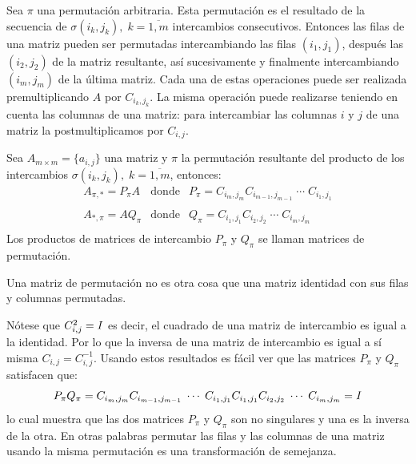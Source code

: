 Sea $\pi$ una permutación arbitraria. Esta permutación es el resultado de la secuencia de $\sigma(i_k, j_k),\; k=\overline{1,m}$ intercambios consecutivos. Entonces las filas de una matriz pueden ser permutadas intercambiando las filas $(i_1, j_1)$, después las $(i_2, j_2)$ de la matriz resultante, as\'i sucesivamente y finalmente intercambiando $(i_m, j_m)$ de la \'ultima matriz. Cada una de estas operaciones puede ser realizada premultiplicando $A$ por $C_{i_k, j_k}$. La misma operación puede realizarse teniendo en cuenta las columnas de una matriz: para intercambiar las columnas $i$ y $j$ de una matriz la postmultiplicamos por $C_{i,j}$.
\begin{lemma}\label{lm:dual_permutation}
	Sea $A_{m \times m} = \{a_{i,j}\}$ una matriz y $\pi$ la permutación resultante del producto de los intercambios $\sigma(i_k, j_k),\; k=\overline{1,m}$, entonces:
	\begin{equation}
		\begin{array}{rcl}
			A_{\pi,\ast} = P_\pi A &\mbox{donde}& P_\pi = C_{i_m, j_m}C_{i_{m-1}, j_{m-1}}\;\cdots\;C_{i_1, j_1}\\
			\\
			A_{\ast,\pi} = A Q_\pi &\mbox{donde}& Q_\pi = C_{i_1, j_1}C_{i_2, j_2}\;\cdots\;C_{i_m, j_m}\\
		\end{array}
	\end{equation}
	Los productos de matrices de intercambio $P_\pi$ y $Q_\pi$ se llaman matrices de permutación.
\end{lemma}

\begin{definition}
	Una matriz de permutación no es otra cosa que una matriz identidad con sus filas y columnas permutadas.
\end{definition}

N\'otese que $C_{i, j}^2 = \mathbb{\mathit{I}}$ es decir, el cuadrado de una matriz de intercambio es igual a la identidad. Por lo que la inversa de una matriz de intercambio es igual a sí misma $C_{i, j} = C_{i, j}^{-1}$. Usando estos resultados es fácil ver que las matrices $P_\pi$ y $Q_\pi$ satisfacen que:
\begin{equation}
	P_\pi Q_\pi = C_{i_m, j_m}C_{i_{m-1}, j_{m-1}}\;\cdots\;C_{i_1, j_1} C_{i_1, j_1}C_{i_2, j_2}\;\cdots\;C_{i_m, j_m} = \mathbb{\mathit{I}}
	\label{eq:dual_permutation}
\end{equation}
lo cual muestra que las dos matrices $P_\pi$ y $Q_\pi$ son no singulares y una es la inversa de la otra. En otras palabras permutar las filas y las columnas de una matriz usando la misma permutación es una transformación de semejanza.

